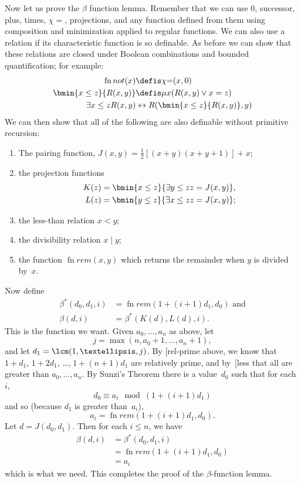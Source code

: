 \documentclass[10pt,a4paper]{article}
\makeatletter
\theoremstyle{plain}
\theoremstyle{definition}
\theoremstyle{remark}
\newcommand{\olref}{\@ifnextchar[{\olref@i}{\olref@final}}
\def\olref@i[#1]{\@ifnextchar[{\olref@ii}{\olref@final}}
\def\olref@ii[#1]{\@ifnextchar[{\olref@iii}{\olref@final}}
\def\olref@iii[#1]{\olref@final}
\def\olref@final#1{\ref{#1}}
\providecommand{\lif}{\mathbin{\rightarrow}}
\providecommand{\Char}{\chi}
\providecommand{\bforall}{\forall}
\providecommand{\bexists}{\exists}
\providecommand{\umin}{\mu}
\providecommand{\defiff}{\mathrel{\leftrightarrow}}
\providecommand{\fn}{\operatorname{fn}}
\providecommand{\defiff}{\mathrel{\leftrightarrow}}
\providecommand{\fn}{\operatorname{fn}}
\makeatother
\begin{document}
Now let us prove the $\beta$ function lemma. Remember that we can use
$0$, successor, plus, times, $\Char{=}$, projections, and any function
defined from them using composition and minimization applied to
regular functions. We can also use a relation if its characteristic
function is so definable. As before we can show that these relations
are closed under Boolean combinations and bounded quantification; for
example:
\begin{align*}
\fn{not}(x) & \defis \Char{=}(x,0)\\
\bmin{x \leq z}{R(x,y)} & \defis \umin{x}{(R(x,y) \lor x = z)}\\
\bexists{x \leq z}{R(x,y)} & \defiff R(\bmin{x \leq z}{R(x,y)}, y)
\end{align*}
We can then show that all of the following are also definable without
primitive recursion:
\begin{enumerate}
\item The pairing function, $J(x,y) = \frac{1}{2}[(x+y)(x+y+1)] + x$;
\item the projection functions
\begin{align*}
K(z) & = \bmin{x \leq z}{\bexists{y \leq z}{z = J(x,y)}},\\
L(z) & = \bmin{y \leq z}{\bexists{x \leq z}{z = J(x,y)}};
\end{align*}
\item the less-than relation $x < y$;
\item the divisibility relation $x \mid y$;
\item the function $\fn{rem}(x,y)$ which returns the remainder when
  $y$ is divided by~$x$.
\end{enumerate}
Now define
\begin{align*}
\beta^*(d_0,d_1,i) & = \fn{rem}(1+(i+1) d_1,d_0) \text{ and}\\
\beta(d,i) & = \beta^*(K(d),L(d),i).
\end{align*}
This is the function we want. Given $a_0,\dots,a_n$ as above, let
\[
j = \max(n,a_0+1,\dots,a_n+1),
\]
and let $d_1 = \lcm(1,\dots,j)$. By \olref{rel-prime} above,
we know that $1+d_1$, $1+2 d_1$, \dots, $1+(n+1) d_1$ are relatively
prime, and by~\olref{less} that all are greater than $a_0,\dots,a_n$.
By Sunzi's Theorem there is a value~$d_0$ such that for each~$i$,
\[
d_0 \equiv a_i \mod (1+(i+1)d_1)
\]
and so (because $d_1$ is greater than~$a_i$),
\[
a_i = \fn{rem}(1+(i+1)d_1,d_0).
\]
Let $d = J(d_0,d_1)$. Then for each $i \le n$, we have
\begin{align*}
\beta(d,i) & =  \beta^*(d_0,d_1,i) \\
& =  \fn{rem}(1+(i+1) d_1,d_0) \\
& =  a_i
\end{align*}
which is what we need. This completes the proof of the
$\beta$-function lemma.
\end{document}
